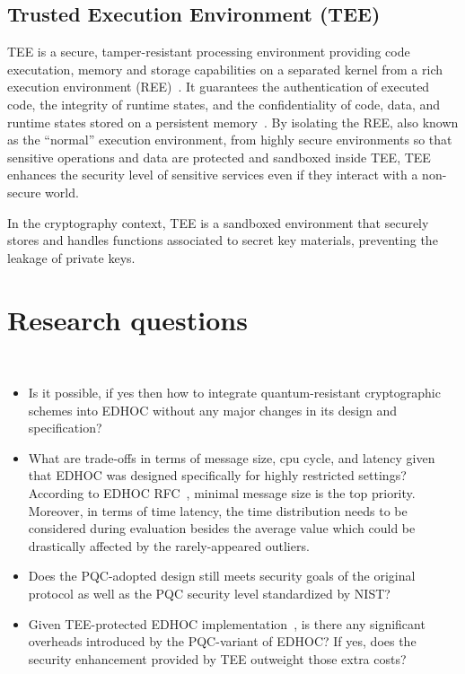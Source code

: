 \subsection{Trusted Execution Environment (TEE)}
TEE is a secure, tamper-resistant processing environment providing code executation,
memory and storage capabilities on a separated kernel from a rich execution
environment (REE)~\cite{tee-mobile}. It guarantees the authentication
of executed code, the integrity of runtime states, and the confidentiality of
code, data, and runtime states stored on a persistent memory~\cite{tee-overview}.
By isolating the REE, also known as the ``normal'' execution environment, from
highly secure environments so that sensitive operations and data are protected
and sandboxed inside TEE, TEE enhances the security level of sensitive services
even if they interact with a non-secure world.

In the cryptography context, TEE is a sandboxed environment that securely stores
and handles functions associated to secret key materials, preventing the leakage
of private keys.

\section{Research questions}
~\label{sec:research-questions}
\begin{itemize}
    \item Is it possible, if yes then how to integrate quantum-resistant cryptographic schemes into EDHOC
    without any major changes in its design and specification?
    \item What are trade-offs in terms of message size, cpu cycle, and latency given that
    EDHOC was designed specifically for highly restricted settings? According to EDHOC RFC~\cite{edhoc-rfc},
    minimal message size is the top priority. Moreover, in terms of time latency, the time distribution
    needs to be considered during evaluation besides the average value which could be drastically affected by
    the rarely-appeared outliers.
    \item Does the PQC-adopted design still meets security goals of the original protocol as
    well as the PQC security level standardized by NIST\@?
    \item Given TEE-protected EDHOC implementation~\cite{oscore-tee-performance}, is there any
    significant overheads introduced by the PQC-variant of EDHOC\@? If yes, does the security
    enhancement provided by TEE outweight those extra costs?
\end{itemize}

